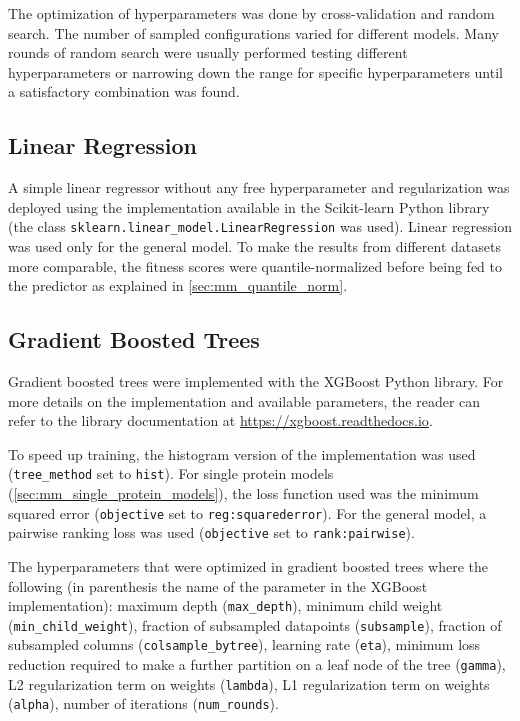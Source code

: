 The optimization of hyperparameters was done by cross-validation and random search.
The number of sampled configurations varied for different models.
Many rounds of random search were usually performed testing different hyperparameters or narrowing down the range for specific hyperparameters until a satisfactory combination was found.

\subsection{Linear Regression}
A simple linear regressor without any free hyperparameter and regularization was deployed using the implementation available in the Scikit-learn Python library (the class \texttt{sklearn.linear\_model.LinearRegression} was used).
Linear regression was used only for the general model.
To make the results from different datasets more comparable, the fitness scores were quantile-normalized before being fed to the predictor as explained in \cref{sec:mm_quantile_norm}.

\subsection{Gradient Boosted Trees}
Gradient boosted trees were implemented with the XGBoost Python library.
For more details on the implementation and available parameters, the reader can refer to the library documentation at \url{https://xgboost.readthedocs.io}.

To speed up training, the histogram version of the implementation was used (\texttt{tree\_method} set to \texttt{hist}).
For single protein models (\cref{sec:mm_single_protein_models}), the loss function used was the minimum squared error (\texttt{objective} set to \texttt{reg:squarederror}).
For the general model, a pairwise ranking loss was used (\texttt{objective} set to \texttt{rank:pairwise}).

The hyperparameters that were optimized in gradient boosted trees where the following (in parenthesis the name of the parameter in the XGBoost implementation): maximum depth (\texttt{max\_depth}), minimum child weight (\texttt{min\_child\_weight}), fraction of subsampled datapoints (\texttt{subsample}), fraction of subsampled columns (\texttt{colsample\_bytree}), learning rate (\texttt{eta}), minimum loss reduction required to make a further partition on a leaf node of the tree (\texttt{gamma}), L2 regularization term on weights (\texttt{lambda}), L1 regularization term on weights (\texttt{alpha}), number of iterations (\texttt{num\_rounds}).


